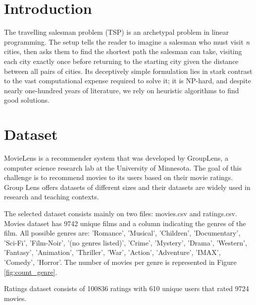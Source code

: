 \documentclass[12pt]{article}
\numberwithin{equation}{section}
\begin{document}
\newpage

\section{Introduction}

The travelling salesman problem (TSP) is an archetypal problem in linear programming. The setup tells the reader to imagine a salesman who must visit \textit{n} cities, then asks them to find the shortest path the salesman can take, visiting each city exactly once before returning to the starting city given the distance between all pairs of cities. Its deceptively simple formulation lies in stark contrast to the vast computational expense required to solve it; it is NP-hard, and despite nearly one-hundred years of literature, we rely on heuristic algorithms to find good solutions. 

\section{Dataset}

MovieLens is a recommender system that was developed by GroupLens, a computer science research lab at the University of Minnesota. The goal of this challenge is to recommend movies to its users based on their movie ratings. Group Lens offers datasets of different sizes and their datasets are widely used in research and teaching contexts.

The selected dataset consists mainly on two files: movies.csv and ratings.csv. Movies dataset has 9742 unique films and a column indicating the genres of the film. All possible genres are: 'Romance', 'Musical', 'Children', 'Documentary', 'Sci-Fi', 'Film-Noir', '(no genres listed)', 'Crime', 'Mystery', 'Drama', 'Western', 'Fantasy', 'Animation', 'Thriller', 'War', 'Action', 'Adventure', 'IMAX', 'Comedy', 'Horror'. The number of movies per genre is represented in Figure \ref{fig:count_genre}.

Ratings dataset consists of 100836 ratings with 610 unique users that rated 9724 movies. 

\begin{figure}[h!]
 \end{figure}
\end{document}
